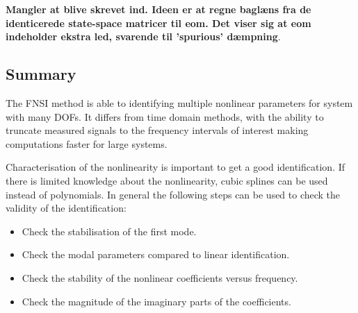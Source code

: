 \textbf{Mangler at blive skrevet ind. Ideen er at regne baglæns fra de
  identicerede state-space matricer til eom. Det viser sig at eom indeholder
  ekstra led, svarende til 'spurious' dæmpning}.


\subsection{Summary}
\label{sec:summary-fnsi}

The FNSI method is able to identifying multiple nonlinear parameters for system
with many DOFs. It differs from time domain methods, with the ability to
truncate measured signals to the frequency intervals of interest making
computations faster for large systems.

Characterisation of the nonlinearity is important to get a good identification.
If there is limited knowledge about the nonlinearity, cubic splines can be used
instead of polynomials.
In general the following steps can be used to check the validity of the
identification:

\begin{itemize}
\item Check the stabilisation of the first mode.
\item Check the modal parameters compared to linear identification.
\item Check the stability of the nonlinear coefficients versus frequency.
\item Check the magnitude of the imaginary parts of the coefficients.
\end{itemize}


